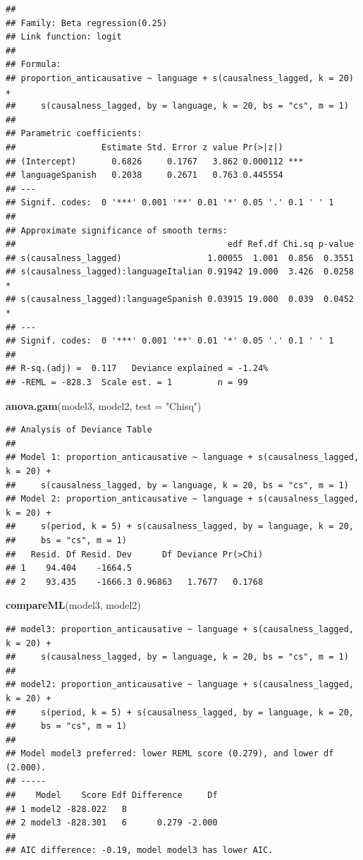 \documentclass[
]{article}
\newenvironment{Shaded}{\begin{snugshade}}{\end{snugshade}}
\newcommand{\AttributeTok}[1]{\textcolor[rgb]{0.13,0.29,0.53}{#1}}
\newcommand{\FunctionTok}[1]{\textcolor[rgb]{0.13,0.29,0.53}{\textbf{#1}}}
\newcommand{\NormalTok}[1]{#1}
\newcommand{\StringTok}[1]{\textcolor[rgb]{0.31,0.60,0.02}{#1}}
\begin{document}
\begin{verbatim}
## 
## Family: Beta regression(0.25) 
## Link function: logit 
## 
## Formula:
## proportion_anticausative ~ language + s(causalness_lagged, k = 20) + 
##     s(causalness_lagged, by = language, k = 20, bs = "cs", m = 1)
## 
## Parametric coefficients:
##                 Estimate Std. Error z value Pr(>|z|)    
## (Intercept)       0.6826     0.1767   3.862 0.000112 ***
## languageSpanish   0.2038     0.2671   0.763 0.445554    
## ---
## Signif. codes:  0 '***' 0.001 '**' 0.01 '*' 0.05 '.' 0.1 ' ' 1
## 
## Approximate significance of smooth terms:
##                                          edf Ref.df Chi.sq p-value  
## s(causalness_lagged)                 1.00055  1.001  0.856  0.3551  
## s(causalness_lagged):languageItalian 0.91942 19.000  3.426  0.0258 *
## s(causalness_lagged):languageSpanish 0.03915 19.000  0.039  0.0452 *
## ---
## Signif. codes:  0 '***' 0.001 '**' 0.01 '*' 0.05 '.' 0.1 ' ' 1
## 
## R-sq.(adj) =  0.117   Deviance explained = -1.24%
## -REML = -828.3  Scale est. = 1         n = 99
\end{verbatim}

\begin{Shaded}
\begin{Highlighting}[]
\FunctionTok{anova.gam}\NormalTok{(model3, model2, }\AttributeTok{test =} \StringTok{"Chisq"}\NormalTok{) }
\end{Highlighting}
\end{Shaded}

\begin{verbatim}
## Analysis of Deviance Table
## 
## Model 1: proportion_anticausative ~ language + s(causalness_lagged, k = 20) + 
##     s(causalness_lagged, by = language, k = 20, bs = "cs", m = 1)
## Model 2: proportion_anticausative ~ language + s(causalness_lagged, k = 20) + 
##     s(period, k = 5) + s(causalness_lagged, by = language, k = 20, 
##     bs = "cs", m = 1)
##   Resid. Df Resid. Dev      Df Deviance Pr(>Chi)
## 1    94.404    -1664.5                          
## 2    93.435    -1666.3 0.96863   1.7677   0.1768
\end{verbatim}

\begin{Shaded}
\begin{Highlighting}[]
\FunctionTok{compareML}\NormalTok{(model3, model2)}
\end{Highlighting}
\end{Shaded}

\begin{verbatim}
## model3: proportion_anticausative ~ language + s(causalness_lagged, k = 20) + 
##     s(causalness_lagged, by = language, k = 20, bs = "cs", m = 1)
## 
## model2: proportion_anticausative ~ language + s(causalness_lagged, k = 20) + 
##     s(period, k = 5) + s(causalness_lagged, by = language, k = 20, 
##     bs = "cs", m = 1)
## 
## Model model3 preferred: lower REML score (0.279), and lower df (2.000).
## -----
##    Model    Score Edf Difference     Df
## 1 model2 -828.022   8                  
## 2 model3 -828.301   6      0.279 -2.000
## 
## AIC difference: -0.19, model model3 has lower AIC.
\end{verbatim}
\end{document}
